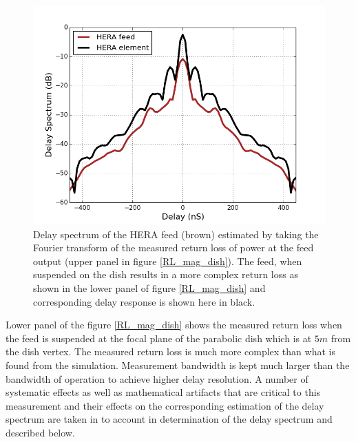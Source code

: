\documentclass[twocolumn]{emulateapj}
\begin{document}
\begin{figure}       
\centering
\includegraphics[width=\linewidth]{GB_reflectometry_part3/plot/ds_feed_dish.png}
\caption{Delay spectrum of the HERA feed (brown) estimated by taking the Fourier transform of the measured return loss of power at the feed output (upper panel in figure \ref{RL_mag_dish}). The feed, when suspended on the dish results in a more complex return loss as shown in the lower panel of figure \ref{RL_mag_dish} and corresponding delay response is shown here in black. }
\label{ds_feed_on_dish_trans}
\end{figure}

Lower panel of the figure \ref{RL_mag_dish} shows the measured return loss when
the feed is suspended at the focal plane of the parabolic dish which is at $5m$
from the dish vertex. The measured return loss is much more complex than what
is found from the simulation. 
Measurement bandwidth is kept much larger than the bandwidth of operation to
achieve higher delay resolution. A number of systematic effects as well as
mathematical artifacts that are critical to this measurement and their effects
on the corresponding estimation of the delay spectrum are taken in to account
in determination of the delay spectrum and described below. 
\end{document}
